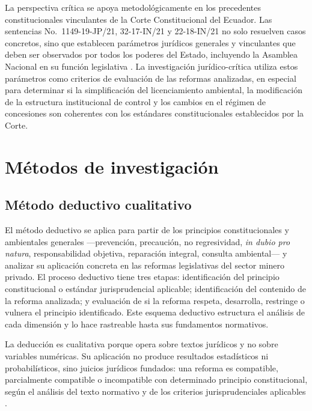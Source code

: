 La perspectiva crítica se apoya metodológicamente en los precedentes constitucionales vinculantes de la Corte Constitucional del Ecuador. Las sentencias No.\ 1149-19-JP/21, 32-17-IN/21 y 22-18-IN/21 no solo resuelven casos concretos, sino que establecen parámetros jurídicos generales y vinculantes que deben ser observados por todos los poderes del Estado, incluyendo la Asamblea Nacional en su función legislativa \parencite{cce_32_17_in_21,cce_22_18_in_21,cce_1149_19_jp_21}. La investigación jurídico-crítica utiliza estos parámetros como criterios de evaluación de las reformas analizadas, en especial para determinar si la simplificación del licenciamiento ambiental, la modificación de la estructura institucional de control y los cambios en el régimen de concesiones son coherentes con los estándares constitucionales establecidos por la Corte.

\section{Métodos de investigación}

\subsection{Método deductivo cualitativo}

El método deductivo se aplica para partir de los principios constitucionales y ambientales generales ---prevención, precaución, no regresividad, \textit{in dubio pro natura}, responsabilidad objetiva, reparación integral, consulta ambiental--- y analizar su aplicación concreta en las reformas legislativas del sector minero privado. El proceso deductivo tiene tres etapas: identificación del principio constitucional o estándar jurisprudencial aplicable; identificación del contenido de la reforma analizada; y evaluación de si la reforma respeta, desarrolla, restringe o vulnera el principio identificado. Este esquema deductivo estructura el análisis de cada dimensión y lo hace rastreable hasta sus fundamentos normativos.

La deducción es cualitativa porque opera sobre textos jurídicos y no sobre variables numéricas. Su aplicación no produce resultados estadísticos ni probabilísticos, sino juicios jurídicos fundados: una reforma es compatible, parcialmente compatible o incompatible con determinado principio constitucional, según el análisis del texto normativo y de los criterios jurisprudenciales aplicables \parencite{grefa_valencia_2021}.

